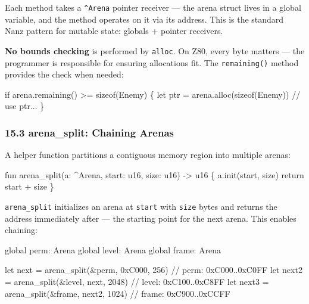 \documentclass[
  11pt,
]{article}
\newenvironment{Shaded}{}{}
\newcommand{\NormalTok}[1]{#1}
\begin{document}
Each method takes a \texttt{\^{}Arena} pointer receiver --- the arena
struct lives in a global variable, and the method operates on it via its
address. This is the standard Nanz pattern for mutable state: globals +
pointer receivers.

\textbf{No bounds checking} is performed by \texttt{alloc}. On Z80,
every byte matters --- the programmer is responsible for ensuring
allocations fit. The \texttt{remaining()} method provides the check when
needed:

\begin{Shaded}
\begin{Highlighting}[]
\NormalTok{if arena.remaining() \textgreater{}= sizeof(Enemy) \{}
\NormalTok{    let ptr = arena.alloc(sizeof(Enemy))}
\NormalTok{    // use ptr...}
\NormalTok{\}}
\end{Highlighting}
\end{Shaded}

\subsubsection{15.3 arena\_split: Chaining
Arenas}\label{arena_split-chaining-arenas}

A helper function partitions a contiguous memory region into multiple
arenas:

\begin{Shaded}
\begin{Highlighting}[]
\NormalTok{fun arena\_split(a: \^{}Arena, start: u16, size: u16) {-}\textgreater{} u16 \{}
\NormalTok{    a.init(start, size)}
\NormalTok{    return start + size}
\NormalTok{\}}
\end{Highlighting}
\end{Shaded}

\texttt{arena\_split} initializes an arena at \texttt{start} with
\texttt{size} bytes and returns the address immediately after --- the
starting point for the next arena. This enables chaining:

\begin{Shaded}
\begin{Highlighting}[]
\NormalTok{global perm: Arena}
\NormalTok{global level: Arena}
\NormalTok{global frame: Arena}

\NormalTok{let next = arena\_split(\&perm, 0xC000, 256)     // perm: 0xC000..0xC0FF}
\NormalTok{let next2 = arena\_split(\&level, next, 2048)     // level: 0xC100..0xC8FF}
\NormalTok{let next3 = arena\_split(\&frame, next2, 1024)    // frame: 0xC900..0xCCFF}
\end{Highlighting}
\end{Shaded}
\end{document}
